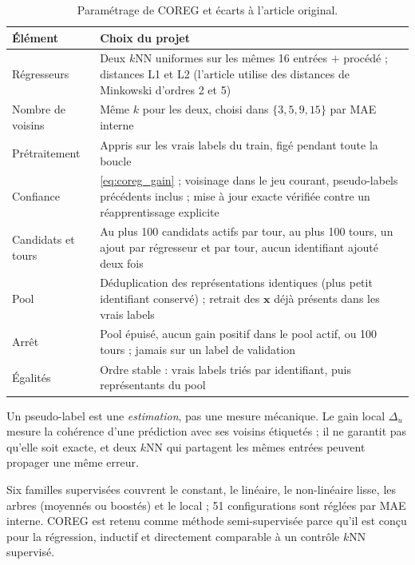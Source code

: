 \begin{table}[htbp]
\centering
\small
\caption{Paramétrage de COREG et écarts à l'article original.}
\label{tab:coreg_choix}
\begin{tabularx}{\textwidth}{@{}>{\raggedright\arraybackslash}p{3.4cm} L@{}}
\toprule
Élément & Choix du projet \\
\midrule
Régresseurs & Deux $k$NN uniformes sur les mêmes 16 entrées $+$ procédé ; distances L1 et L2 (l'article utilise des distances de Minkowski d'ordres 2 et 5) \\
Nombre de voisins & Même $k$ pour les deux, choisi dans $\{3, 5, 9, 15\}$ par MAE interne \\
Prétraitement & Appris sur les vrais labels du train, figé pendant toute la boucle \\
Confiance & \cref{eq:coreg_gain} ; voisinage dans le jeu courant, pseudo-labels précédents inclus ; mise à jour exacte vérifiée contre un réapprentissage explicite \\
Candidats et tours & Au plus 100 candidats actifs par tour, au plus 100 tours, un ajout par régresseur et par tour, aucun identifiant ajouté deux fois \\
Pool & Déduplication des représentations identiques (plus petit identifiant conservé) ; retrait des $\bm{x}$ déjà présents dans les vrais labels \\
Arrêt & Pool épuisé, aucun gain positif dans le pool actif, ou 100 tours ; jamais sur un label de validation \\
Égalités & Ordre stable : vrais labels triés par identifiant, puis représentants du pool \\
\bottomrule
\end{tabularx}
\end{table}

\begin{precaution}
Un pseudo-label est une \emph{estimation}, pas une mesure mécanique. Le gain
local $\Delta_u$ mesure la cohérence d'une prédiction avec ses voisins étiquetés ;
il ne garantit pas qu'elle soit exacte, et deux $k$NN qui partagent les mêmes
entrées peuvent propager une même erreur.
\end{precaution}

\begin{aretenir}
Six familles supervisées couvrent le constant, le linéaire, le non-linéaire lisse,
les arbres (moyennés ou boostés) et le local ; 51 configurations sont réglées par
MAE interne.
COREG est retenu comme méthode semi-supervisée parce qu'il est conçu pour la
régression, inductif et directement comparable à un contrôle $k$NN supervisé.
\end{aretenir}
